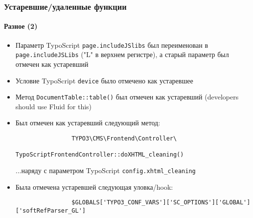 \begin{frame}[fragile]
	\frametitle{Устаревшие/удаленные функции}
	\framesubtitle{Разное (2)}

	\begin{itemize}
		\item Параметр TypoScript \texttt{page.includeJSlibs} был переименован в\newline
			\texttt{page.includeJSLibs} ("L" в верхнем регистре), а старый параметр был отмечен как устаревший

		\item Условие TypoScript \texttt{device} было отмечено как устаревшее

		\item Метод \texttt{DocumentTable::table()} был отмечен как устаревший\newline
			\small(developers should use Fluid for this)\normalsize

		\item Был отмечен как устаревший следующий метод:
			\begin{lstlisting}
				TYPO3\CMS\Frontend\Controller\
				    TypoScriptFrontendController::doXHTML_cleaning()
			\end{lstlisting}
			...наряду с параметром TypoScript
			\small
				\texttt{config.xhtml\_cleaning}
			\normalsize

		\item Была отмечена устаревшей следующая уловка/hook:
			\begin{lstlisting}
				$GLOBALS['TYPO3_CONF_VARS']['SC_OPTIONS']['GLOBAL']['softRefParser_GL']
			\end{lstlisting}

	\end{itemize}

\end{frame}


